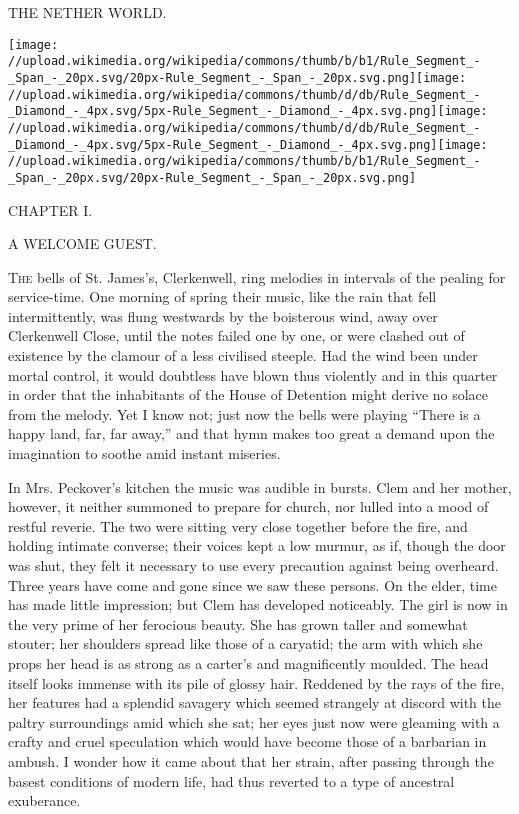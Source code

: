 {}

{THE NETHER WORLD.}

\texttt{[image: //upload.wikimedia.org/wikipedia/commons/thumb/b/b1/Rule\_Segment\_-\_Span\_-\_20px.svg/20px-Rule\_Segment\_-\_Span\_-\_20px.svg.png]}\texttt{[image: //upload.wikimedia.org/wikipedia/commons/thumb/d/db/Rule\_Segment\_-\_Diamond\_-\_4px.svg/5px-Rule\_Segment\_-\_Diamond\_-\_4px.svg.png]}\texttt{[image: //upload.wikimedia.org/wikipedia/commons/thumb/d/db/Rule\_Segment\_-\_Diamond\_-\_4px.svg/5px-Rule\_Segment\_-\_Diamond\_-\_4px.svg.png]}\texttt{[image: //upload.wikimedia.org/wikipedia/commons/thumb/b/b1/Rule\_Segment\_-\_Span\_-\_20px.svg/20px-Rule\_Segment\_-\_Span\_-\_20px.svg.png]}

{CHAPTER I.}

A WELCOME GUEST.

\textsc{The} bells of St. James's, Clerkenwell, ring melodies in
intervals of the pealing for service-time. One morning of spring their
music, like the rain that fell intermittently, was flung westwards by
the boisterous wind, away over Clerkenwell Close, until the notes failed
one by one, or were clashed out of existence by the clamour of a less
civilised steeple. Had the wind been under mortal control, it would
doubtless have blown thus violently and in this quarter in order that
the inhabitants of the House of Detention might derive no solace from
the melody. Yet I know not; just now the bells were {}playing ``There is
a happy land, far, far away,'' and that hymn makes too great a demand
upon the imagination to soothe amid instant miseries.

In Mrs. Peckover's kitchen the music was audible in bursts. Clem and her
mother, however, it neither summoned to prepare for church, nor lulled
into a mood of restful reverie. The two were sitting very close together
before the fire, and holding intimate converse; their voices kept a low
murmur, as if, though the door was shut, they felt it necessary to use
every precaution against being overheard. Three years have come and gone
since we saw these persons. On the elder, time has made little
impression; but Clem has developed noticeably. The girl is now in the
very prime of her ferocious beauty. She has grown taller and somewhat
stouter; her shoulders spread like those of a caryatid; the arm with
which she props her head is as strong as a carter's and magnificently
moulded. The head itself looks immense with its pile of glossy hair.
{}Reddened by the rays of the fire, her features had a splendid savagery
which seemed strangely at discord with the paltry surroundings amid
which she sat; her eyes just now were gleaming with a crafty and cruel
speculation which would have become those of a barbarian in ambush. I
wonder how it came about that her strain, after passing through the
basest conditions of modern life, had thus reverted to a type of
ancestral exuberance.

